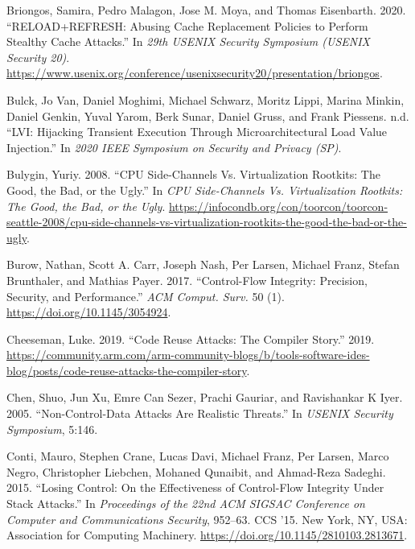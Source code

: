 \documentclass[
  a4paper,
]{report}
\newlength{\cslhangindent}
\newenvironment{CSLReferences}[2] %
{\begin{list}{}{%
	\setlength{\itemindent}{0pt}
	\setlength{\leftmargin}{0pt}
	\setlength{\parsep}{0pt}
	\ifodd #1
	\setlength{\leftmargin}{\cslhangindent}
	\setlength{\itemindent}{-1\cslhangindent}
	\fi
	\setlength{\itemsep}{#2\baselineskip}}}
{\end{list}}
\begin{document}
\begin{CSLReferences}{1}{0}
Briongos, Samira, Pedro Malagon, Jose M. Moya, and Thomas Eisenbarth.
2020. {``{RELOAD+REFRESH}: Abusing Cache Replacement Policies to Perform
Stealthy Cache Attacks.''} In \emph{29th USENIX Security Symposium
(USENIX Security 20)}.
\url{https://www.usenix.org/conference/usenixsecurity20/presentation/briongos}.

Bulck, Jo Van, Daniel Moghimi, Michael Schwarz, Moritz Lippi, Marina
Minkin, Daniel Genkin, Yuval Yarom, Berk Sunar, Daniel Gruss, and Frank
Piessens. n.d. {``{LVI}: Hijacking Transient Execution Through
Microarchitectural Load Value Injection.''} In \emph{2020 {IEEE}
Symposium on Security and Privacy ({SP})}.

Bulygin, Yuriy. 2008. {``{CPU} Side-Channels Vs. Virtualization
Rootkits: The Good, the Bad, or the Ugly.''} In \emph{CPU Side-Channels
Vs. Virtualization Rootkits: The Good, the Bad, or the Ugly}.
\url{https://infocondb.org/con/toorcon/toorcon-seattle-2008/cpu-side-channels-vs-virtualization-rootkits-the-good-the-bad-or-the-ugly}.

Burow, Nathan, Scott A. Carr, Joseph Nash, Per Larsen, Michael Franz,
Stefan Brunthaler, and Mathias Payer. 2017. {``Control-Flow Integrity:
Precision, Security, and Performance.''} \emph{ACM Comput. Surv.} 50
(1). \url{https://doi.org/10.1145/3054924}.

Cheeseman, Luke. 2019. {``Code Reuse Attacks: The Compiler Story.''}
2019.
\url{https://community.arm.com/arm-community-blogs/b/tools-software-ides-blog/posts/code-reuse-attacks-the-compiler-story}.

Chen, Shuo, Jun Xu, Emre Can Sezer, Prachi Gauriar, and Ravishankar K
Iyer. 2005. {``Non-Control-Data Attacks Are Realistic Threats.''} In
\emph{USENIX Security Symposium}, 5:146.

Conti, Mauro, Stephen Crane, Lucas Davi, Michael Franz, Per Larsen,
Marco Negro, Christopher Liebchen, Mohaned Qunaibit, and Ahmad-Reza
Sadeghi. 2015. {``Losing Control: On the Effectiveness of Control-Flow
Integrity Under Stack Attacks.''} In \emph{Proceedings of the 22nd ACM
SIGSAC Conference on Computer and Communications Security}, 952--63. CCS
'15. New York, NY, USA: Association for Computing Machinery.
\url{https://doi.org/10.1145/2810103.2813671}.


\end{CSLReferences}
\end{document}
